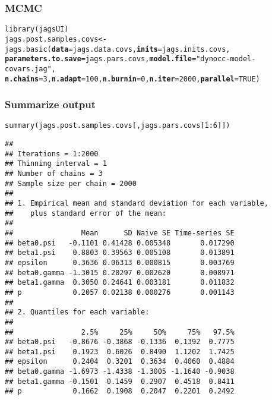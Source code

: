 \documentclass[color=usenames,dvipsnames]{beamer}\usepackage[]{graphicx}\usepackage[]{color}
\makeatletter
\newcommand{\hlnum}[1]{\textcolor[rgb]{0.69,0.494,0}{#1}}%
\newcommand{\hlstr}[1]{\textcolor[rgb]{0.749,0.012,0.012}{#1}}%
\newcommand{\hlopt}[1]{\textcolor[rgb]{0,0,0}{#1}}%
\newcommand{\hlstd}[1]{\textcolor[rgb]{0,0,0}{#1}}%
\newcommand{\hlkwb}[1]{\textcolor[rgb]{0,0.341,0.682}{#1}}%
\newcommand{\hlkwc}[1]{\textcolor[rgb]{0,0,0}{\textbf{#1}}}%
\newcommand{\hlkwd}[1]{\textcolor[rgb]{0.004,0.004,0.506}{#1}}%
\newenvironment{kframe}{%
 \def\at@end@of@kframe{}%
 \ifinner\ifhmode%
  \def\at@end@of@kframe{\end{minipage}}%
  \begin{minipage}{\columnwidth}%
 \fi\fi%
 \def\FrameCommand##1{\hskip\@totalleftmargin \hskip-\fboxsep
 \colorbox{shadecolor}{##1}\hskip-\fboxsep
     \hskip-\linewidth \hskip-\@totalleftmargin \hskip\columnwidth}%
 \MakeFramed {\advance\hsize-\width
   \@totalleftmargin\z@ \linewidth\hsize
   \@setminipage}}%
 {\par\unskip\endMakeFramed%
 \at@end@of@kframe}
\newenvironment{knitrout}{}{} %
\makeatother
\begin{document}
\begin{frame}[fragile]
  \frametitle{MCMC}
  \small
\begin{knitrout}\scriptsize
{}\color{fgcolor}\begin{kframe}
\begin{alltt}
\hlkwd{library}\hlstd{(jagsUI)}
\hlstd{jags.post.samples.covs} \hlkwb{<-} \hlkwd{jags.basic}\hlstd{(}\hlkwc{data}\hlstd{=jags.data.covs,} \hlkwc{inits}\hlstd{=jags.inits.covs,}
    \hlkwc{parameters.to.save}\hlstd{=jags.pars.covs,} \hlkwc{model.file}\hlstd{=}\hlstr{"dynocc-model-covars.jag"}\hlstd{,}
    \hlkwc{n.chains}\hlstd{=}\hlnum{3}\hlstd{,} \hlkwc{n.adapt}\hlstd{=}\hlnum{100}\hlstd{,} \hlkwc{n.burnin}\hlstd{=}\hlnum{0}\hlstd{,} \hlkwc{n.iter}\hlstd{=}\hlnum{2000}\hlstd{,} \hlkwc{parallel}\hlstd{=}\hlnum{TRUE}\hlstd{)}
\end{alltt}
\end{kframe}
\end{knitrout}
\end{frame}



\begin{frame}[fragile]
  \frametitle{Summarize output}
\begin{knitrout}\tiny
{}\color{fgcolor}\begin{kframe}
\begin{alltt}
\hlkwd{summary}\hlstd{(jags.post.samples.covs[,jags.pars.covs[}\hlnum{1}\hlopt{:}\hlnum{6}\hlstd{]])}
\end{alltt}
\begin{verbatim}
## 
## Iterations = 1:2000
## Thinning interval = 1 
## Number of chains = 3 
## Sample size per chain = 2000 
## 
## 1. Empirical mean and standard deviation for each variable,
##    plus standard error of the mean:
## 
##                Mean      SD Naive SE Time-series SE
## beta0.psi   -0.1101 0.41428 0.005348       0.017290
## beta1.psi    0.8803 0.39563 0.005108       0.013891
## epsilon      0.3636 0.06313 0.000815       0.003769
## beta0.gamma -1.3015 0.20297 0.002620       0.008971
## beta1.gamma  0.3050 0.24641 0.003181       0.011832
## p            0.2057 0.02138 0.000276       0.001143
## 
## 2. Quantiles for each variable:
## 
##                2.5%     25%     50%     75%   97.5%
## beta0.psi   -0.8676 -0.3868 -0.1336  0.1392  0.7775
## beta1.psi    0.1923  0.6026  0.8490  1.1202  1.7425
## epsilon      0.2404  0.3201  0.3634  0.4060  0.4884
## beta0.gamma -1.6973 -1.4338 -1.3005 -1.1640 -0.9038
## beta1.gamma -0.1501  0.1459  0.2907  0.4518  0.8411
## p            0.1662  0.1908  0.2047  0.2201  0.2492
\end{verbatim}
\end{kframe}
\end{knitrout}
\end{frame}
\end{document}
